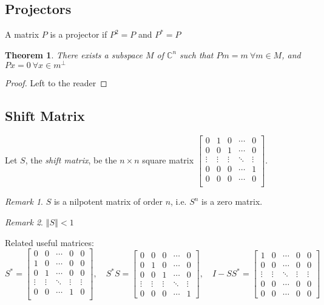 \documentclass[twofold]{article}
\newcommand*\adj[1]{#1^*}
\newcommand*\norm[1]{\left \Vert #1 \right\Vert}
\theoremstyle{plain}
\newtheorem{theorem}{Theorem}
\theoremstyle{definition}
\theoremstyle{remark}
\newtheorem*{remark}{Remark}
\begin{document}
\subsection{Projectors}
A matrix \(P\) is a projector if \(P^2 = P\) and \(\adj{P} = P\)

\begin{theorem} There exists a subspace \(M\) of \(\mathbb{C}^n\) such that \(Pm = m \ \forall m \in M\), and \(P x = 0 \ \forall x \in m^\perp\) \end{theorem}
\begin{proof} Left to the reader \end{proof}

\subsection{Shift Matrix}
Let \(S\), the {\em shift matrix},  be the \(n \times n\) square matrix \( \begin{bmatrix} 
0 & 1 & 0 & \cdots & 0 \\
0 & 0 & 1 & \cdots & 0 \\
\vdots & \vdots & \vdots &\ddots & \vdots \\
0 & 0 & 0 &\cdots & 1 \\
0 & 0 & 0 & \cdots & 0 \\ 
\end{bmatrix}\). 

 \begin{remark} \(S\) is a nilpotent matrix of order \(n\), i.e. \(S^n\) is a zero matrix. \end{remark}

\begin{remark} \(\norm{S} < 1\) \end{remark}

Related useful matrices: 
\[\adj{S} =  \begin{bmatrix} 
0 & 0 & \cdots & 0 & 0 \\
1 & 0 & \cdots & 0 & 0 \\
0 & 1 & \cdots & 0 & 0 \\
\vdots & \vdots & \ddots &\vdots & \vdots \\
0 & 0 & \cdots & 1 & 0 \\ 
\end{bmatrix}, \quad 
\adj{S} S  =  \begin{bmatrix} 
0 & 0 & 0 & \cdots & 0 \\
0 & 1 & 0 & \cdots & 0 \\
0 & 0 & 1 & \cdots & 0 \\
\vdots & \vdots & \vdots & \ddots & \vdots \\
0 & 0 & 0 & \cdots & 1
\end{bmatrix}, \quad 
 I - S \adj{S} =  \begin{bmatrix} 
1 & 0 & \cdots & 0 & 0 \\
0 & 0 & \cdots & 0 & 0 \\
\vdots & \vdots & \ddots &\vdots & \vdots \\
0 & 0 & \cdots & 0 & 0 \\ 
0 & 0 & \cdots & 0 & 0
\end{bmatrix}\]
\end{document}
